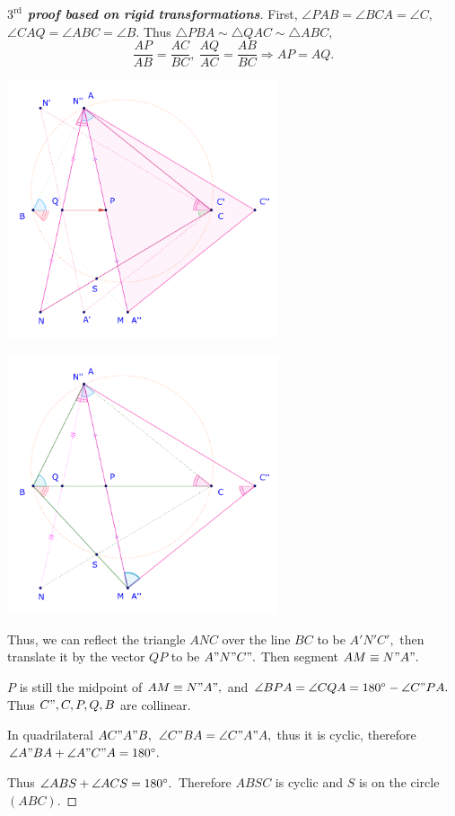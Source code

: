 \documentclass{article}
\begin{document}
\begin{proof}[\textbf{$3^{\text{rd}}$ proof based on rigid transformations}]
    First, $\angle PAB = \angle BCA = \angle C,$ $\angle CAQ = \angle ABC = \angle B.$
    Thus $\triangle PBA \sim \triangle QAC \sim \triangle ABC,$
    \[
        \frac{AP}{AB} = \frac{AC}{BC},\ \frac{AQ}{AC} = \frac{AB}{BC} \Rightarrow AP = AQ.
    \]

    \begin{center}
        \begin{minipage}{8cm}
            \centering
            \includegraphics[width=8cm]{./svg/pdf/ot-22-23-4-e2-s6a.pdf}
        \end{minipage}
        \quad
        \begin{minipage}{8cm}
            \centering
            \includegraphics[width=8cm]{./svg/pdf/ot-22-23-4-e2-s6b.pdf}
        \end{minipage}
    \end{center}

    Thus, we can reflect the triangle $ANC$ over the line $BC$ to be $A'N'C',$
    then translate it by the vector $QP$ to be $A"N"C".$ Then segment $AM \equiv N"A".$

    $P$ is still the midpoint of $AM \equiv N"A",$ and $\angle BPA = \angle CQA = 180^\circ - \angle C"PA.$
    Thus $C", C, P, Q, B$ are collinear.

    In quadrilateral $AC"A"B,$ $\angle C"BA = \angle C"A"A,$ thus it is cyclic, therefore $\angle A"BA + \angle A"C"A = 180^\circ.$

    Thus $\angle ABS + \angle ACS = 180^\circ.$ Therefore $ABSC$ is cyclic and $S$ is on the circle $(ABC).$
\end{proof}
\end{document}
